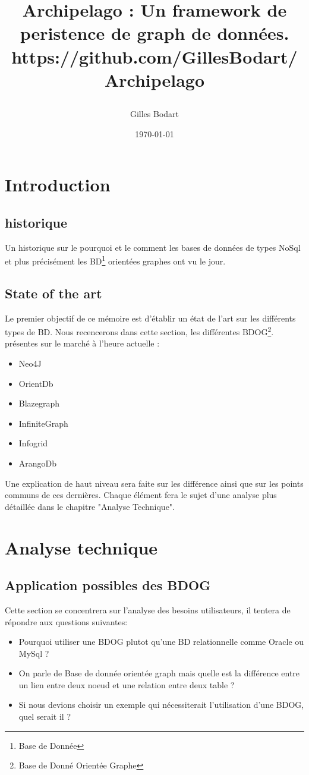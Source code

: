 \documentclass[a4paper,12pt,twoside, fleqn]{report}
\author{Gilles Bodart}
\date{\today}
\title{%
    \begin{minipage}\linewidth
        \centering\bfseries\sffamily
        Archipelago : Un framework de peristence de graph de données.
        \vskip4pt
        \large https://github.com/GillesBodart/Archipelago
    \end{minipage}
}
\begin{document}
\maketitle
 	
\chapter{Introduction}
\section{historique} 
Un historique sur le pourquoi et le comment les bases de données de types NoSql et plus précisément les BD\footnote{Base de Donnée} orientées graphes ont vu le jour.
\section{State of the art}	
Le premier objectif de ce mémoire est d'établir un état de l'art sur les différents types de BD. Nous recencerons dans cette section, les différentes BDOG\footnote{Base de Donné Orientée Graphe}. présentes sur le marché à l'heure actuelle :
\begin{itemize}
\item Neo4J
\item OrientDb
\item Blazegraph
\item InfiniteGraph
\item Infogrid
\item ArangoDb
\end{itemize}
Une explication de haut niveau sera faite sur les différence ainsi que sur les points communs de ces dernières. Chaque élément fera le sujet d'une analyse plus détaillée dans le chapitre "Analyse Technique".


\chapter{Analyse technique}
\section{Application possibles des BDOG}
Cette section se concentrera sur l'analyse des besoins utilisateurs, il tentera de répondre aux questions suivantes: 
\begin{itemize}
\item Pourquoi utiliser une BDOG plutot qu'une BD relationnelle comme Oracle ou MySql ?
\item On parle de Base de donnée orientée graph mais quelle est la différence entre un lien entre deux noeud et une relation entre deux table ?
\item Si nous devions choisir un exemple qui nécessiterait l'utilisation d'une BDOG, quel serait il ?
\end{itemize}
\end{document}
